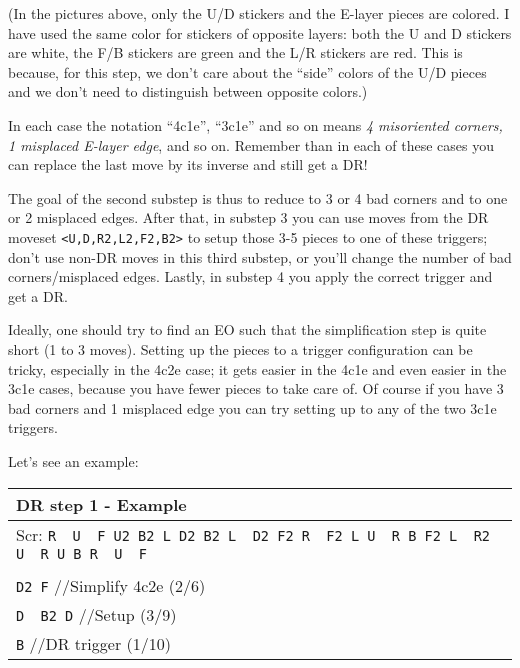 \documentclass[11pt,a4paper]{book}
\newcommand{\p}{\textquotesingle}
\newcommand{\m}{\texttt}
\newcommand{\ps}{\p\,\,}
\newcommand{\comment}[1]{{\color{gray}\quad//#1}}
\begin{document}
(In the pictures above, only the U/D stickers and the E-layer pieces are colored. I have used the same color for stickers of opposite layers: both the U and D stickers are white, the F/B stickers are green and the L/R stickers are red. This is because, for this step, we don't care about the ``side'' colors of the U/D pieces and we don't need to distinguish between opposite colors.)

In each case the notation ``4c1e'', ``3c1e'' and so on means \emph{4 misoriented corners, 1 misplaced E-layer edge}, and so on. Remember than in each of these cases you can replace the last move by its inverse and still get a DR!

The goal of the second substep is thus to reduce to 3 or 4 bad corners and to one or 2 misplaced edges. After that, in substep 3 you can use moves from the DR moveset \m{<U,D,R2,L2,F2,B2>} to setup those 3-5 pieces to one of these triggers; don't use non-DR moves in this third substep, or you'll change the number of bad corners/misplaced edges. Lastly, in substep 4 you apply the correct trigger and get a DR.

Ideally, one should try to find an EO such that the simplification step is quite short (1 to 3 moves). Setting up the pieces to a trigger configuration can be tricky, especially in the 4c2e case; it gets easier in the 4c1e and even easier in the 3c1e cases, because you have fewer pieces to take care of. Of course if you have 3 bad corners and 1 misplaced edge you can try setting up to any of the two 3c1e triggers.

Let's see an example:

\bigskip
\begin{tabular}{|p{}|}
\hline
\textbf{DR step 1 - Example}\\
\hline
Scr: \m{R\ps U\ps F  U2 B2 L  D2 B2 L\ps D2 F2 R\ps F2 L  U\ps R B  F2 L\ps R2 U\ps R  U  B R\ps U\ps F}\\
\hline
\begin{minipage}[l]{0.650\textwidth}
\m{R\ps F\ps B L\p} \comment{EO (4/4)}\\
\m{D2 F} \comment{Simplify 4c2e (2/6)}\\
\m{D\ps B2 D\p} \comment{Setup (3/9)}\\
\m{B\p} \comment{DR trigger (1/10)}
\end{minipage}
\begin{minipage}[c]{0.25\textwidth}

\end{minipage}\\
\hline
\end{tabular}
\bigskip
\end{document}
